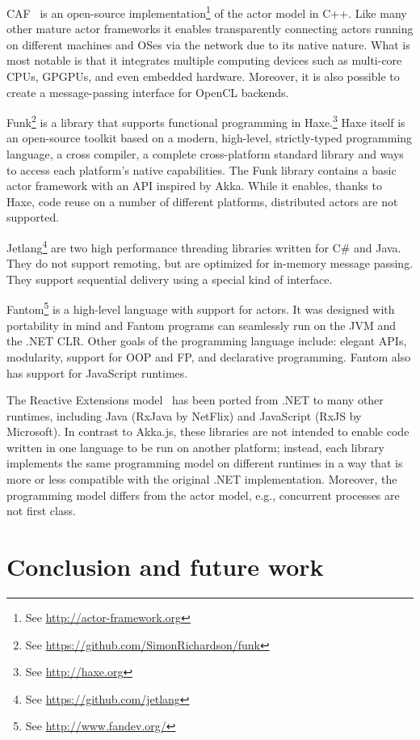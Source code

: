 \documentclass{sig-alternate}
\begin{document}
CAF~\cite{CharoussetHS14} is an open-source implementation\footnote{See \url{http://actor-framework.org}} of the actor model in C++. Like many other mature actor frameworks it enables transparently connecting actors running on different machines and OSes via the network due to its native nature. What is most notable is that it integrates multiple computing devices such as multi-core CPUs, GPGPUs, and even embedded hardware. Moreover, it is also possible to create a message-passing interface for OpenCL backends.

Funk\footnote{See \url{https://github.com/SimonRichardson/funk}} is a library that supports functional programming in Haxe.\footnote{See \url{http://haxe.org}} Haxe itself is an open-source toolkit based on a modern, high-level, strictly-typed programming language, a cross compiler, a complete cross-platform standard library and ways to access each platform's native capabilities. The Funk library contains a basic actor framework with an API inspired by Akka. While it enables, thanks to Haxe, code reuse on a number of different platforms, distributed actors are not supported.

Jetlang\footnote{See \url{https://github.com/jetlang}} are two high performance threading libraries written for C\# and Java. They do not support remoting, but are optimized for in-memory message passing. They support sequential delivery using a special kind of interface.

Fantom\footnote{See \url{http://www.fandev.org/}} is a high-level language with support for actors. It was designed with portability in mind and Fantom programs can seamlessly run on the JVM and the .NET CLR. Other goals of the programming language include: elegant APIs, modularity, support for OOP and FP, and declarative programming. Fantom also has support for JavaScript runtimes.

The Reactive Extensions model~\cite{Meijer12} has been ported from .NET to
many other runtimes, including Java (RxJava by NetFlix) and JavaScript (RxJS
by Microsoft). In contrast to Akka.js, these libraries are not intended to
enable code written in one language to be run on another platform; instead,
each library implements the same programming model on different runtimes in a
way that is more or less compatible with the original .NET implementation.
Moreover, the programming model differs from the actor model, e.g., concurrent
processes are not first class.


\section{Conclusion and future work}\label{sec:conclusion}
\end{document}
